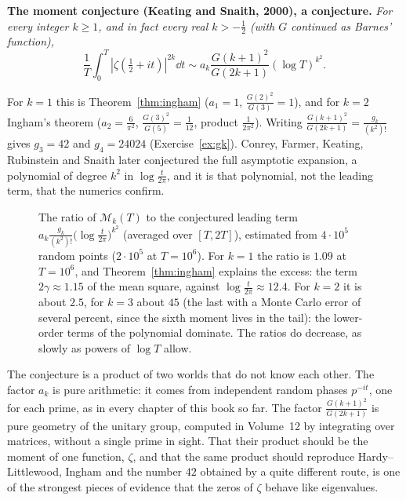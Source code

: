 \medskip\noindent\textbf{The moment conjecture (Keating and Snaith, 2000), a conjecture.} \emph{For every integer $k\ge1$, and in fact every real $k>-\frac12$ (with $G$ continued as Barnes' function),
\[
\frac1T\int_0^T|\zeta(\tfrac12+it)|^{2k}\dd t\sim a_k\frac{G(k+1)^2}{G(2k+1)}(\log T)^{k^2}.
\]}

\medskip
For $k=1$ this is Theorem~\ref{thm:ingham} ($a_1=1$, $\frac{G(2)^2}{G(3)}=1$), and for $k=2$ Ingham's theorem ($a_2=\frac6{\pi^2}$, $\frac{G(3)^2}{G(5)}=\frac1{12}$, product $\frac1{2\pi^2}$). Writing $\frac{G(k+1)^2}{G(2k+1)}=\frac{g_k}{(k^2)!}$ gives $g_3=42$ and $g_4=24024$ (Exercise~\ref{ex:gk}). Conrey, Farmer, Keating, Rubinstein and Snaith later conjectured the full asymptotic expansion, a polynomial of degree $k^2$ in $\log\frac t{2\pi}$, and it is that polynomial, not the leading term, that the numerics confirm.

\begin{figure}[ht]
\centering{}
\caption{The ratio of $\mathcal M_k(T)$ to the conjectured leading term $a_k\frac{g_k}{(k^2)!}\bigl(\log\frac t{2\pi}\bigr)^{k^2}$ (averaged over $[T,2T]$), estimated from $4\cdot10^5$ random points ($2\cdot10^5$ at $T=10^6$). For $k=1$ the ratio is $1.09$ at $T=10^6$, and Theorem~\ref{thm:ingham} explains the excess: the term $2\gamma\approx1.15$ of the mean square, against $\log\frac t{2\pi}\approx12.4$. For $k=2$ it is about $2.5$, for $k=3$ about $45$ (the last with a Monte Carlo error of several percent, since the sixth moment lives in the tail): the lower-order terms of the polynomial dominate. The ratios do decrease, as slowly as powers of $\log T$ allow.}
\label{fig:momentratios}
\end{figure}

\begin{beauty}
The conjecture is a product of two worlds that do not know each other. The factor $a_k$ is pure arithmetic: it comes from independent random phases $p^{-it}$, one for each prime, as in every chapter of this book so far. The factor $\frac{G(k+1)^2}{G(2k+1)}$ is pure geometry of the unitary group, computed in Volume~12 by integrating over matrices, without a single prime in sight. That their product should be the moment of one function, $\zeta$, and that the same product should reproduce Hardy--Littlewood, Ingham and the number $42$ obtained by a quite different route, is one of the strongest pieces of evidence that the zeros of $\zeta$ behave like eigenvalues.
\end{beauty}

